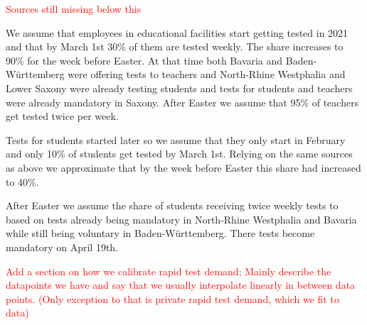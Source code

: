 
\textcolor{red}{Sources still missing below this}

We assume that employees in educational facilities start getting tested in 2021 and that
by March 1st 30\% of them are tested weekly. The share increases to 90\% for the week before Easter. At that time both Bavaria and Baden-Württemberg were offering tests to teachers and North-Rhine Westphalia and Lower Saxony were already testing students and tests for students and teachers were already mandatory in Saxony. After Easter we assume that 95\% of teachers get tested twice per week.

Tests for students started later so we assume that they only start in February and only
10\% of students get tested by March 1st. Relying on the same sources as above we
approximate that by the week before Easter this share had increased to 40\%.

After Easter we assume the share of students receiving twice weekly tests to
based on tests already being mandatory in North-Rhine Westphalia and Bavaria while still
being voluntary in Baden-Württemberg. There tests become mandatory on April 19th.











\textcolor{red}{
    Add a section on how we calibrate rapid test demand; Mainly describe the
    datapoints we have and say that we usually interpolate linearly in between data
    points. (Only exception to that is private rapid test demand, which we fit to data)
}


